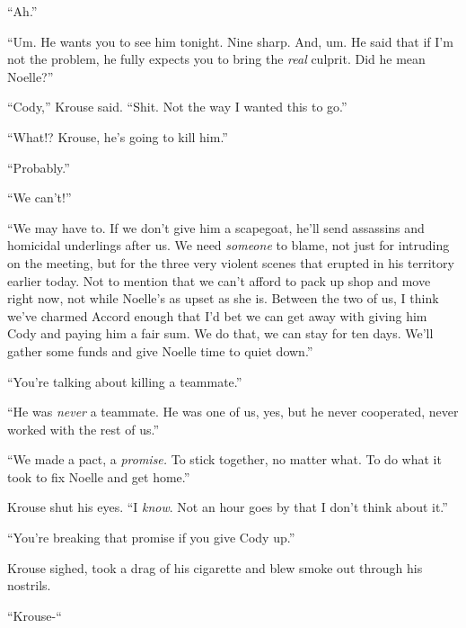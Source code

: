 ``Ah.''



``Um.  He wants you to see him tonight.  Nine sharp.  And, um.  He said that if I'm not the problem, he fully expects you to bring the \emph{real} culprit.  Did he mean Noelle?''



``Cody,'' Krouse said.  ``Shit.  Not the way I wanted this to go.''



``What!?  Krouse, he's going to kill him.''



``Probably.''



``We can't!''



``We may have to.  If we don't give him a scapegoat, he'll send assassins and homicidal underlings after us.  We need \emph{someone} to blame, not just for intruding on the meeting, but for the three very violent scenes that erupted in his territory earlier today.  Not to mention that we can't afford to pack up shop and move right now, not while Noelle's as upset as she is.  Between the two of us, I think we've charmed Accord enough that I'd bet we can get away with giving him Cody and paying him a fair sum.  We do that, we can stay for ten days.  We'll gather some funds and give Noelle time to quiet down.''



``You're talking about killing a teammate.''



``He was \emph{never} a teammate.  He was one of us, yes, but he never cooperated, never worked with the rest of us.''



``We made a pact, a \emph{promise.  }To stick together, no matter what.  To do what it took to fix Noelle and get home.''



Krouse shut his eyes.  ``I \emph{know}.  Not an hour goes by that I don't think about it.''



``You're breaking that promise if you give Cody up.''



Krouse sighed, took a drag of his cigarette and blew smoke out through his nostrils.



``Krouse-``




